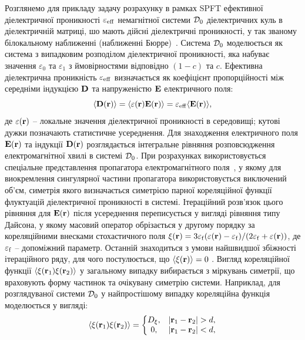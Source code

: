 \documentclass[14pt,twoside]{vakthesis}
\begin{document}
Розглянемо для прикладу задачу розрахунку в рамках SPFT   ефективної діелектричної проникності ${\varepsilon}_{\rm eff}$ немагнітної системи ${\cal D}_0$ діелектричних куль в діелектричній матриці, шо мають дійсні діелектричні проникності,  у так званому білокальному наближенні (наближенні Бюрре)~\cite{Tsang1981,RyzhovRev}.
Система ${\cal D}_0$  моделюється як система з випадковим розподілом діелектричної проникності, яка набуває значення ${\varepsilon}_0$ та ${\varepsilon}_1$ з ймовірностями відповідно $(1-c)$ та $c$.
Ефективна діелектрична проникність ${\varepsilon}_{\rm eff}$ визначається як коефіцієнт пропорційності між середніми індукцією ${\bf D}$ та напруженістю ${\bf E}$ електричного поля:
\begin{equation}\label{eq:eps-eff-def}
 \langle {\bf D} ({\bf r}) \rangle = \langle {\varepsilon} ({\bf r}) {\bf E} ({\bf r}) \rangle
 = {\varepsilon}_{\rm eff} \langle {\bf E} ({\bf r}) \rangle,
\end{equation}
де ${\varepsilon} ({\bf r})$ -- локальне значення діелектричної
проникності в середовищі; кутові дужки позначають статистичне 
усереднення.  Для знаходження електричного поля ${\bf E} ({\bf r}) $ та індукції $ {\bf D} ({\bf r}) $ розглядається інтегральне рівняння розповсюдження електромагнітної хвилі в системі ${\cal D}_0$. 
При розрахунках використовується спеціальне представлення пропагатора електромагнітного поля~\cite{Ryzhov1965, Weighofer1989, Weiglhofer1995, Sushko2004}, у якому для виокремлення сингулярної частини пропагатора використовується виключений об'єм, симетрія якого визначається симетрією парної кореляційної функції флуктуацій діелектричної проникності в системі.
Ітераційний розв'язок  цього рівняння для ${\bf E} ({\bf r})$  після усереднення переписується у вигляді рівняння типу Дайсона, у якому  масовий оператор обрізається у другому порядку за кореляційними внесками стохастичного поля 
$\xi({\bf r}) = 3\varepsilon_{\rm f} (\varepsilon({\bf r}) - \varepsilon_{\rm f})/(2\varepsilon_{\rm f} + \varepsilon({\bf r}))$, де $\varepsilon_{\rm f}$ -- допоміжний параметр. Останній знаходиться з умови найшвидшої збіжності ітераційного ряду, для чого постулюється, що $\langle \xi({\bf r}) \rangle = 0$
\cite{Tsang1981, Ryzhov1965, RyzhovRev, Mackay2000}. 
Вигляд кореляційної функції $\langle \xi({\bf r}_1) \xi({\bf r}_2) \rangle$ у загальному випадку вибирається з міркувань симетрії, що враховують форму частинок та очікувану симетрію системи. Наприклад, для розглядуваної системи ${\cal D}_0$ у найпростішому випадку кореляційна функція моделюється у вигляді:
$$
\langle \xi({\bf r}_1) \xi({\bf r}_2) \rangle  =  \left\{ 
\begin{matrix}
D_{\xi},& |{\bf r}_1 - {\bf r}_2| > d, \\
0,& |{\bf r}_1 - {\bf r}_2| < d,
\end{matrix}
\right.
$$
\end{document}

